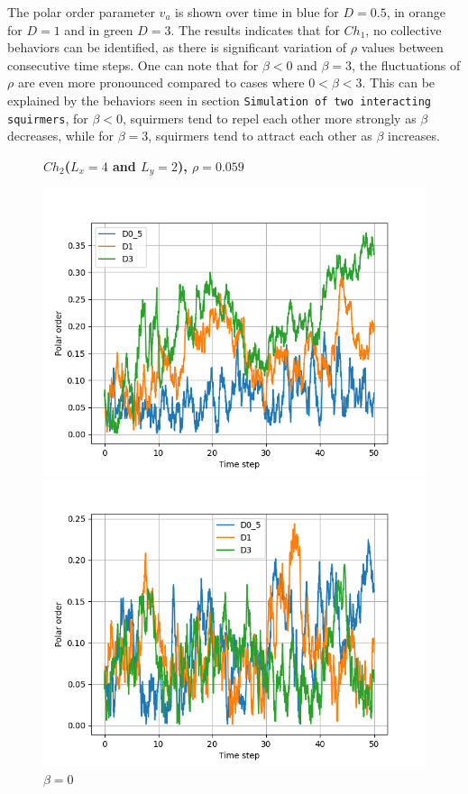\documentclass{article}
\begin{document}
The polar order parameter $v_a$ is shown over time in blue for $D = 0.5$, in orange for $D = 1$ and in green $D=3$. 
The results indicates that for $Ch_1$, no collective behaviors can be identified, as there is significant variation of $\rho$ values
between consecutive time steps. One can note that for $\beta < 0$ and $\beta = 3$, the fluctuations of $\rho$ are 
even more pronounced compared to cases where $0 < \beta < 3$.
This can be explained by the behaviors seen in section \texttt{Simulation of two interacting squirmers}, for $\beta <0$, squirmers
tend to repel each other more strongly as $\beta$ decreases, while for $\beta =3$, squirmers tend to attract each other
as $\beta$ increases. 

\begin{figure}[H]
    \centering
    \textbf{$Ch_2$($L_x = 4$ and $L_y = 2$), $\rho = 0.059$}\par\medskip
    \begin{minipage}{0.49\textwidth}
        \includegraphics[width=1\textwidth]{videos/simulations/sim_D/beta0/dens_0_59/combined_polars.png}
        \caption{\footnotesize $\beta = 0$}
    \end{minipage}\hfill
    \begin{minipage}{0.49\textwidth}
        \includegraphics[width=1\textwidth]{videos/simulations/sim_D/beta1_5/dens_0_59/combined_polars.png}

\end{minipage}
\end{figure}
\end{document}
